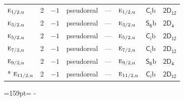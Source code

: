 \documentclass[10pt,a4paper]{article}
\newcommand{\needspace}[1]{\par\penalty-100\begingroup\dimen0=#1\relax\dimen2=\pagegoal
  \advance\dimen2-\pagetotal\ifdim\dimen0>\dimen2\relax\ifdim\dimen2>0pt\vfil\break\fi\fi
  \endgroup}
\numberwithin{equation}{section}
\newcommand{\grp}[1]{\mathsf{#1}}
\newcommand{\irr}[1]{\text{\normalfont\scshape #1}}
\newcommand{\ptag}[1]{\mathrm{#1}}
\newcommand{\secondclass}{\mathrm{b}}
\begin{document}
{\begin{longtable}{@{}lrrlllll@{}}
$\irr{e}_{1/2,\ptag{u}}$ & 2 & $-1$ & pseudoreal & --- & $\irr{e}_{1/2,\ptag{u}}$ & \href{S2b.pdf}{$\grp{C_{i}}\secondclass$} & \href{2D12.pdf}{$\grp{2D_{12}}$}\\
$\irr{e}_{3/2,\ptag{u}}$ & 2 & $-1$ & pseudoreal & --- & $\irr{e}_{3/2,\ptag{u}}$ & \href{S6b.pdf}{$\grp{S_{6}}\secondclass$} & \href{2D4.pdf}{$\grp{2D_{4}}$}\\
$\irr{e}_{5/2,\ptag{u}}$ & 2 & $-1$ & pseudoreal & --- & $\irr{e}_{5/2,\ptag{u}}$ & \href{S2b.pdf}{$\grp{C_{i}}\secondclass$} & \href{2D12.pdf}{$\grp{2D_{12}}$}\\
$\irr{e}_{7/2,\ptag{u}}$ & 2 & $-1$ & pseudoreal & --- & $\irr{e}_{7/2,\ptag{u}}$ & \href{S2b.pdf}{$\grp{C_{i}}\secondclass$} & \href{2D12.pdf}{$\grp{2D_{12}}$}\\
$\irr{e}_{9/2,\ptag{u}}$ & 2 & $-1$ & pseudoreal & --- & $\irr{e}_{9/2,\ptag{u}}$ & \href{S6b.pdf}{$\grp{S_{6}}\secondclass$} & \href{2D4.pdf}{$\grp{2D_{4}}$}\\*
$\irr{e}_{11/2,\ptag{u}}$ & 2 & $-1$ & pseudoreal & --- & $\irr{e}_{11/2,\ptag{u}}$ & \href{S2b.pdf}{$\grp{C_{i}}\secondclass$} & \href{2D12.pdf}{$\grp{2D_{12}}$}\\
\bottomrule\end{longtable}}
\needspace{159pt}
\end{document}
